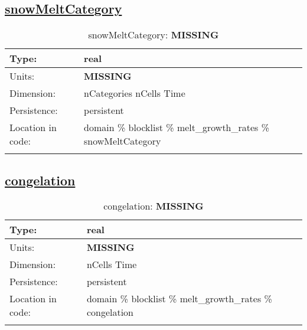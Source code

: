 \subsection[snowMeltCategory]{\hyperref[sec:var_tab_melt_growth_rates]{snowMeltCategory}}
\label{subsec:var_sec_melt_growth_rates_snowMeltCategory}
\begin{center}
\begin{longtable}{| p{2.0in} | p{4.0in} |}
        \hline 
        Type: & real \\
        \hline 
        Units: & {\bf \color{red} MISSING} \\
        \hline 
        Dimension: & nCategories nCells Time \\
        \hline 
        Persistence: & persistent \\
        \hline 
         Location in code: & domain \% blocklist \% melt\_growth\_rates \% snowMeltCategory \\
         \hline 
    \caption{snowMeltCategory: {\bf \color{red} MISSING}}
\end{longtable}
\end{center}
\subsection[congelation]{\hyperref[sec:var_tab_melt_growth_rates]{congelation}}
\label{subsec:var_sec_melt_growth_rates_congelation}
\begin{center}
\begin{longtable}{| p{2.0in} | p{4.0in} |}
        \hline 
        Type: & real \\
        \hline 
        Units: & {\bf \color{red} MISSING} \\
        \hline 
        Dimension: & nCells Time \\
        \hline 
        Persistence: & persistent \\
        \hline 
         Location in code: & domain \% blocklist \% melt\_growth\_rates \% congelation \\
         \hline 
    \caption{congelation: {\bf \color{red} MISSING}}
\end{longtable}
\end{center}
